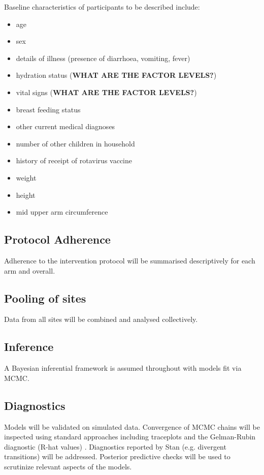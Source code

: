 \documentclass[a4paper]{article}
\begin{document}
Baseline characteristics of participants to be described include:

\begin{itemize}
    \item age
    \item sex
    \item details of illness (presence of diarrhoea, vomiting, fever)
    \item hydration status (\textbf{WHAT ARE THE FACTOR LEVELS?})
    \item vital signs (\textbf{WHAT ARE THE FACTOR LEVELS?})
    \item breast feeding status
    \item other current medical diagnoses
    \item number of other children in household
    \item history of receipt of rotavirus vaccine
    \item weight
    \item height
    \item mid upper arm circumference
\end{itemize}

\subsection{Protocol Adherence}

Adherence to the intervention protocol will be summarised descriptively for each arm and overall.

\subsection{Pooling of sites}

Data from all sites will be combined and analysed collectively.

\subsection{Inference}

A Bayesian inferential framework is assumed throughout with models fit via MCMC.

\subsection{Diagnostics}

Models will be validated on simulated data.
Convergence of MCMC chains will be inspected using standard approaches including traceplots and the Gelman-Rubin diagnostic (R-hat values) \cite{gelman_rubin_1992}.
Diagnostics reported by Stan (e.g. divergent transitions) will be addressed. 
Posterior predictive checks will be used to scrutinize relevant aspects of the models.
\end{document}
